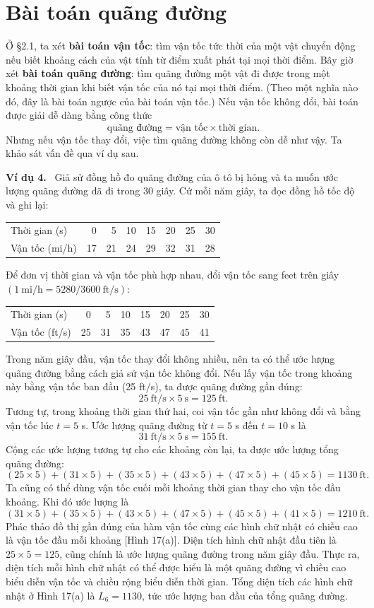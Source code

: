 \documentclass[12pt,a4paper]{article}
\newcommand{\ex}[1]{\par\medskip\noindent\textbf{Ví dụ #1.}\ }
\begin{document}
\section*{Bài toán quãng đường}
Ở §2.1, ta xét \textbf{bài toán vận tốc}: tìm vận tốc tức thời của một vật chuyển động nếu biết khoảng cách của vật tính từ điểm xuất phát tại mọi thời điểm. Bây giờ xét \textbf{bài toán quãng đường}: tìm quãng đường một vật đi được trong một khoảng thời gian khi biết vận tốc của nó tại mọi thời điểm. (Theo một nghĩa nào đó, đây là bài toán ngược của bài toán vận tốc.) Nếu vận tốc không đổi, bài toán được giải dễ dàng bằng công thức
\[\text{quãng đường}=\text{vận tốc}\times\text{thời gian}.\]
Nhưng nếu vận tốc thay đổi, việc tìm quãng đường không còn dễ như vậy. Ta khảo sát vấn đề qua ví dụ sau.
\ex{4} Giả sử đồng hồ đo quãng đường của ô tô bị hỏng và ta muốn ước lượng quãng đường đã đi trong 30 giây. Cứ mỗi năm giây, ta đọc đồng hồ tốc độ và ghi lại:
\begin{center}\begin{tabular}{lrrrrrrr}\toprule
Thời gian (s)&0&5&10&15&20&25&30\\Vận tốc (mi/h)&17&21&24&29&32&31&28\\\bottomrule\end{tabular}\end{center}
Để đơn vị thời gian và vận tốc phù hợp nhau, đổi vận tốc sang feet trên giây $(1\ \mathrm{mi/h}=5280/3600\ \mathrm{ft/s})$:
\begin{center}\begin{tabular}{lrrrrrrr}\toprule
Thời gian (s)&0&5&10&15&20&25&30\\Vận tốc (ft/s)&25&31&35&43&47&45&41\\\bottomrule\end{tabular}\end{center}
Trong năm giây đầu, vận tốc thay đổi không nhiều, nên ta có thể ước lượng quãng đường bằng cách giả sử vận tốc không đổi. Nếu lấy vận tốc trong khoảng này bằng vận tốc ban đầu (25 ft/s), ta được quãng đường gần đúng:
\[25\ \mathrm{ft/s}\times5\ \mathrm{s}=125\ \mathrm{ft}.\]
Tương tự, trong khoảng thời gian thứ hai, coi vận tốc gần như không đổi và bằng vận tốc lúc $t=5$ s. Ước lượng quãng đường từ $t=5$ s đến $t=10$ s là
\[31\ \mathrm{ft/s}\times5\ \mathrm{s}=155\ \mathrm{ft}.\]
Cộng các ước lượng tương tự cho các khoảng còn lại, ta được ước lượng tổng quãng đường:
\[(25\times5)+(31\times5)+(35\times5)+(43\times5)+(47\times5)+(45\times5)=1130\ \mathrm{ft}.\]
Ta cũng có thể dùng vận tốc cuối mỗi khoảng thời gian thay cho vận tốc đầu khoảng. Khi đó ước lượng là
\[(31\times5)+(35\times5)+(43\times5)+(47\times5)+(45\times5)+(41\times5)=1210\ \mathrm{ft}.\]
Phác thảo đồ thị gần đúng của hàm vận tốc cùng các hình chữ nhật có chiều cao là vận tốc đầu mỗi khoảng [Hình 17(a)]. Diện tích hình chữ nhật đầu tiên là $25\times5=125$, cũng chính là ước lượng quãng đường trong năm giây đầu. Thực ra, diện tích mỗi hình chữ nhật có thể được hiểu là một quãng đường vì chiều cao biểu diễn vận tốc và chiều rộng biểu diễn thời gian. Tổng diện tích các hình chữ nhật ở Hình 17(a) là $L_6=1130$, tức ước lượng ban đầu của tổng quãng đường.
\end{document}

